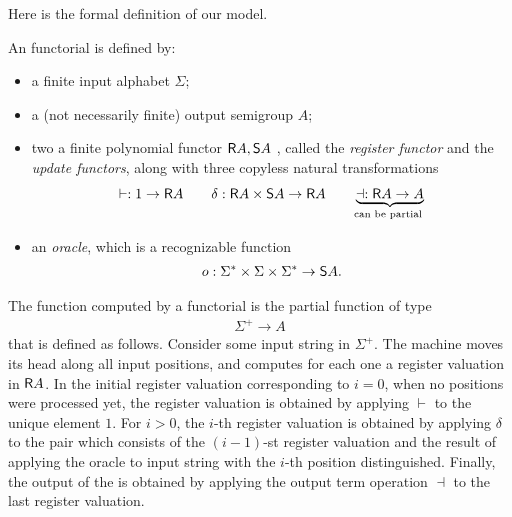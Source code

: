 Here is the formal definition of our \sst model.

\begin{definition}\label{def:functorial-sst}
    An functorial \sst is defined by: 
    \begin{itemize}
    \item a finite  input alphabet $\Sigma$;
    \item a (not necessarily finite) output semigroup $A$;
    \item two a finite  polynomial functor $\mathsf R A, \mathsf S A$ , called the \emph{register functor} and the \emph{update functors}, along with  three copyless natural transformations \begin{align*}
    \vdash: 1 \to \functorr A \qquad \delta : \functorr A \times \functors A \to \functorr A \qquad \myunderbrace{\dashv : \functorr A \to A}{can be partial}
    \end{align*}
    \item an \emph{oracle}, which is a recognizable function 
    \begin{align*}
    o : \Sigma^* \times \Sigma \times \Sigma^* \to \mathsf S A.
    \end{align*}
    
    \end{itemize}
\end{definition}

The function computed by a functorial \sst is the partial function of type 
\begin{align*}
\Sigma^+ \to A
\end{align*}
that is defined as follows. Consider some input string in $\Sigma^+$. The machine moves its head along all input positions, and computes for each one a register valuation in $\mathsf R A$. In the initial register valuation corresponding to $i=0$, when no positions were processed yet, the register valuation  is obtained by applying $\vdash$ to the unique element $1$. For $i > 0$, the $i$-th register valuation is obtained by applying $\delta$ to the pair which consists of the $(i-1)$-st register valuation and the result of applying the oracle to input string with the $i$-th position distinguished. Finally, the output of the \sst is obtained by applying the output term operation $\dashv$ to the last  register valuation.

